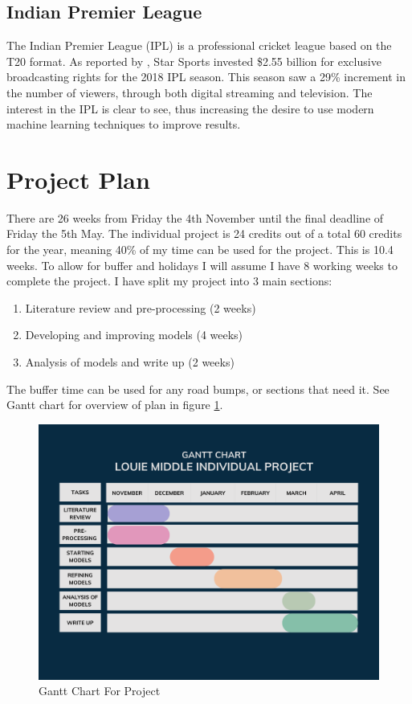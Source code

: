 \documentclass[12pt,a4paper]{report}
\theoremstyle{definition}
\begin{document}
\subsection{Indian Premier League} \label{sec:IPL}

The Indian Premier League (IPL) is a professional cricket league based on the T20 format.
As reported by \citet{ESPNcricinfo2018}, Star Sports invested \$2.55 billion for exclusive broadcasting rights for the 2018 IPL season. 
This season saw a 29\% increment in the number of viewers, through both digital streaming and television. 
The interest in the IPL is clear to see, thus increasing the desire to use modern machine learning techniques to improve results.

\section{Project Plan}

There are 26 weeks from Friday the 4th November until the final deadline of Friday the 5th May. 
The individual project is 24 credits out of a total 60 credits for the year, meaning 40\% of my time can be used for the project. 
This is 10.4 weeks. 
To allow for buffer and holidays I will assume I have 8 working weeks to complete the project. 
I have split my project into 3 main sections:

\begin{enumerate}
    \item Literature review and pre-processing (2 weeks)
    \item Developing and improving models (4 weeks)
    \item Analysis of models and write up (2 weeks)
\end{enumerate}

The buffer time can be used for any road bumps, or sections that need it. 
See Gantt chart for overview of plan in figure \ref{fig:gantt_chart}.

\begin{figure}[H]
    \centering
    \includegraphics[width=\linewidth]{Gantt Chart.png}
    \caption{Gantt Chart For Project}
    \label{fig:gantt_chart}
\end{figure}
\end{document}
